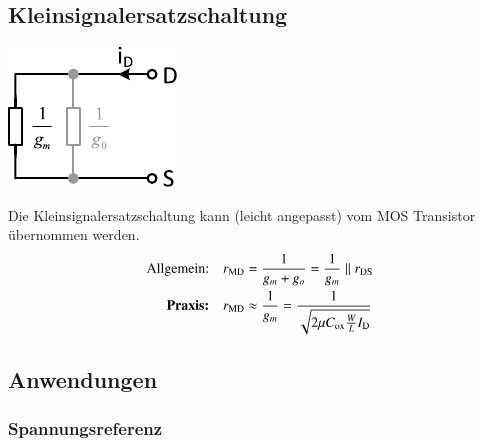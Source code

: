 \subsection{Kleinsignalersatzschaltung}

\begin{minipage}[t]{0.3\columnwidth}
    \includegraphics[width=\columnwidth, align=t]{images/04_MOS_diode_ersatzschaltung_vereinfacht.pdf}
\end{minipage}
\hfill
\begin{minipage}[t]{0.65\columnwidth}
    Die Kleinsignalersatzschaltung kann (leicht angepasst) vom MOS Transistor übernommen werden.
    \begin{align*}
        \text{Allgemein:} \quad             r_\text{\rm MD}  &= \frac{1}{g_m + g_o} = \frac{1}{g_m} \parallel r_{\rm DS} \\
        \text{\textbf{Praxis:}} \quad       r_\text{\rm MD} &\approx \frac{1}{g_m} = \frac{1}{\sqrt{2 \mu C_\text{ox} \frac{W}{L} I_\text{D}}}
    \end{align*}

\end{minipage}


\subsection{Anwendungen}

\subsubsection{Spannungsreferenz}
\label{Spannungsreferenz}

